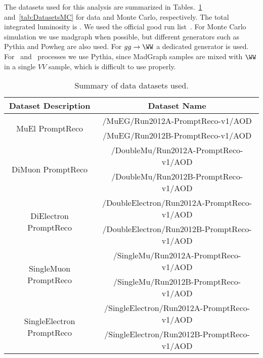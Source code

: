 The datasets used for this analysis are summarized in 
Tables.~\ref{tab:DatasetsData} and~\ref{tab:DatasetsMC} for data and Monte 
Carlo, respectively. The total integrated luminosity is \intlumiEightTeV. 
We used the official good run list~\cite{json}. For Monte Carlo simulation 
we use madgraph when possible, but different generators such as Pythia and Powheg 
are also used.  For $gg \to \WW$ a dedicated generator is used. For \wz\ and \zz\
processes we use Pythia, since MadGraph samples are mixed with $\WW$ in
a single $VV$ sample, which is difficult to use properly.

\begin{table}[!ht]
\begin{center}
\begin{tabular}{|c|c|}
\hline
 Dataset Description                   &   Dataset Name   \\
\hline \hline
\multirow{2}{*}{MuEl PromptReco}   		&  /MuEG/Run2012A-PromptReco-v1/AOD   \\
            							&  /MuEG/Run2012B-PromptReco-v1/AOD   \\
\multirow{2}{*}{DiMuon PromptReco}     	&  /DoubleMu/Run2012A-PromptReco-v1/AOD   \\
          								&  /DoubleMu/Run2012B-PromptReco-v1/AOD   \\
\multirow{2}{*}{DiElectron PromptReco} 	&  /DoubleElectron/Run2012A-PromptReco-v1/AOD   \\
      									&  /DoubleElectron/Run2012B-PromptReco-v1/AOD   \\
\multirow{2}{*}{SingleMuon PromptReco}  &  /SingleMu/Run2012A-PromptReco-v1/AOD   \\
      									&  /SingleMu/Run2012B-PromptReco-v1/AOD   \\
\multirow{2}{*}{SingleElectron PromptReco} 	&  /SingleElectron/Run2012A-PromptReco-v1/AOD   \\
      										&  /SingleElectron/Run2012B-PromptReco-v1/AOD   \\
\hline
\end{tabular}
\caption{Summary of data datasets used.\label{tab:DatasetsData}}
\end{center}
\end{table}

